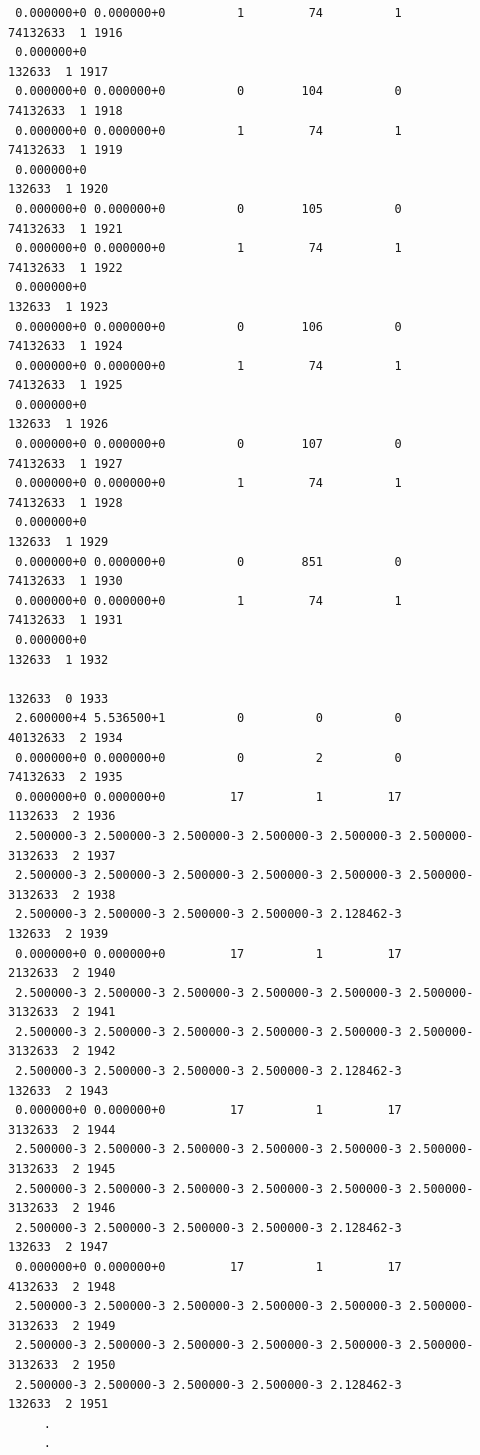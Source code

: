 \begin{verbatim}
 0.000000+0 0.000000+0          1         74          1         74132633  1 1916
 0.000000+0                                                       132633  1 1917
 0.000000+0 0.000000+0          0        104          0         74132633  1 1918
 0.000000+0 0.000000+0          1         74          1         74132633  1 1919
 0.000000+0                                                       132633  1 1920
 0.000000+0 0.000000+0          0        105          0         74132633  1 1921
 0.000000+0 0.000000+0          1         74          1         74132633  1 1922
 0.000000+0                                                       132633  1 1923
 0.000000+0 0.000000+0          0        106          0         74132633  1 1924
 0.000000+0 0.000000+0          1         74          1         74132633  1 1925
 0.000000+0                                                       132633  1 1926
 0.000000+0 0.000000+0          0        107          0         74132633  1 1927
 0.000000+0 0.000000+0          1         74          1         74132633  1 1928
 0.000000+0                                                       132633  1 1929
 0.000000+0 0.000000+0          0        851          0         74132633  1 1930
 0.000000+0 0.000000+0          1         74          1         74132633  1 1931
 0.000000+0                                                       132633  1 1932
                                                                  132633  0 1933
 2.600000+4 5.536500+1          0          0          0         40132633  2 1934
 0.000000+0 0.000000+0          0          2          0         74132633  2 1935
 0.000000+0 0.000000+0         17          1         17          1132633  2 1936
 2.500000-3 2.500000-3 2.500000-3 2.500000-3 2.500000-3 2.500000-3132633  2 1937
 2.500000-3 2.500000-3 2.500000-3 2.500000-3 2.500000-3 2.500000-3132633  2 1938
 2.500000-3 2.500000-3 2.500000-3 2.500000-3 2.128462-3           132633  2 1939
 0.000000+0 0.000000+0         17          1         17          2132633  2 1940
 2.500000-3 2.500000-3 2.500000-3 2.500000-3 2.500000-3 2.500000-3132633  2 1941
 2.500000-3 2.500000-3 2.500000-3 2.500000-3 2.500000-3 2.500000-3132633  2 1942
 2.500000-3 2.500000-3 2.500000-3 2.500000-3 2.128462-3           132633  2 1943
 0.000000+0 0.000000+0         17          1         17          3132633  2 1944
 2.500000-3 2.500000-3 2.500000-3 2.500000-3 2.500000-3 2.500000-3132633  2 1945
 2.500000-3 2.500000-3 2.500000-3 2.500000-3 2.500000-3 2.500000-3132633  2 1946
 2.500000-3 2.500000-3 2.500000-3 2.500000-3 2.128462-3           132633  2 1947
 0.000000+0 0.000000+0         17          1         17          4132633  2 1948
 2.500000-3 2.500000-3 2.500000-3 2.500000-3 2.500000-3 2.500000-3132633  2 1949
 2.500000-3 2.500000-3 2.500000-3 2.500000-3 2.500000-3 2.500000-3132633  2 1950
 2.500000-3 2.500000-3 2.500000-3 2.500000-3 2.128462-3           132633  2 1951
     .
     .
\end{verbatim}
\normalsize

